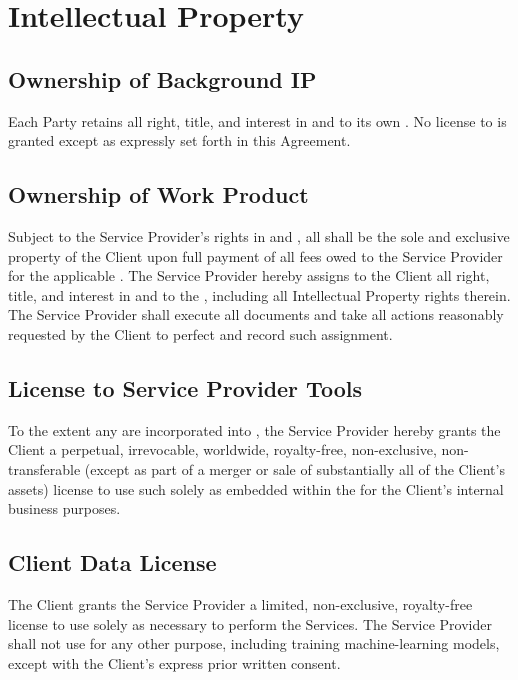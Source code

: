 \section{Intellectual Property}

\subsection{Ownership of Background IP}
Each Party retains all right, title, and interest in and to its own . No license to  is granted except as expressly set forth in this Agreement.

\subsection{Ownership of Work Product}
Subject to the Service Provider's rights in  and , all  shall be the sole and exclusive property of the Client upon full payment of all fees owed to the Service Provider for the applicable . The Service Provider hereby assigns to the Client all right, title, and interest in and to the , including all Intellectual Property rights therein. The Service Provider shall execute all documents and take all actions reasonably requested by the Client to perfect and record such assignment.

\subsection{License to Service Provider Tools}
To the extent any  are incorporated into , the Service Provider hereby grants the Client a perpetual, irrevocable, worldwide, royalty-free, non-exclusive, non-transferable (except as part of a merger or sale of substantially all of the Client's assets) license to use such  solely as embedded within the  for the Client's internal business purposes.

\subsection{Client Data License}
The Client grants the Service Provider a limited, non-exclusive, royalty-free license to use  solely as necessary to perform the Services. The Service Provider shall not use  for any other purpose, including training machine-learning models, except with the Client's express prior written consent.

